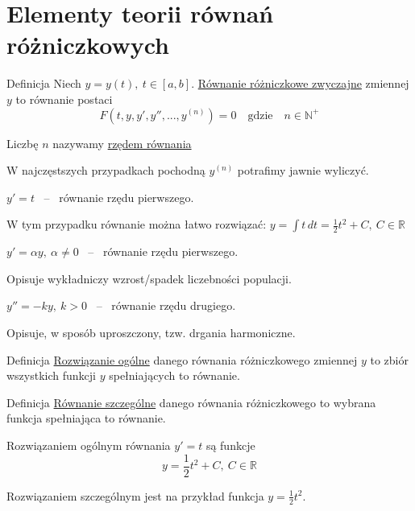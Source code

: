 \section{Elementy teorii równań różniczkowych}

\begin{tw}{Definicja}
    Niech $ y = y(t), \ t \in [a,b] $. \underline{Równanie różniczkowe zwyczajne} zmiennej $y$ to równanie postaci
    \[ F(t, y, y', y'', ..., y^{(n)}) = 0 \quad \text{gdzie} \quad n \in \mathbb{N}^{+} \]

    Liczbę $n$ nazywamy \underline{rzędem równania}
\end{tw}

W najczęstszych przypadkach pochodną $ y^{(n)} $ potrafimy jawnie wyliczyć.

\begin{przyklad}
    $ y' = t $ \ -- \ równanie rzędu pierwszego.

    W tym przypadku równanie można łatwo rozwiązać: $ y = \int t \, dt = \frac{1}{2} t^2 + C, \ C \in \mathbb{R} $
\end{przyklad}

\begin{przyklad}
    $ y' = \alpha y, \ \alpha \neq 0 $ \ -- \ równanie rzędu pierwszego.

    Opisuje wykładniczy wzrost/spadek liczebności populacji.
\end{przyklad}

\begin{przyklad}
    $ y'' = -ky, \ k > 0 $ \ -- \ równanie rzędu drugiego.

    Opisuje, w sposób uproszczony, tzw. drgania harmoniczne.
\end{przyklad}

\begin{tw}{Definicja}
    \underline{Rozwiązanie ogólne} danego równania różniczkowego zmiennej $y$ to zbiór wszystkich funkcji $y$ spełniających to równanie.
\end{tw}

\begin{tw}{Definicja}
    \underline{Równanie szczególne} danego równania różniczkowego to wybrana funkcja spełniająca to równanie.
\end{tw}

\begin{przyklad}
    Rozwiązaniem ogólnym równania $ y' = t $ są funkcje 
    \[ y = \frac{1}{2} t^2 + C, \ C \in \mathbb{R} \]

    Rozwiązaniem szczególnym jest na przykład funkcja $ y = \frac{1}{2} t^2 $.
\end{przyklad}

